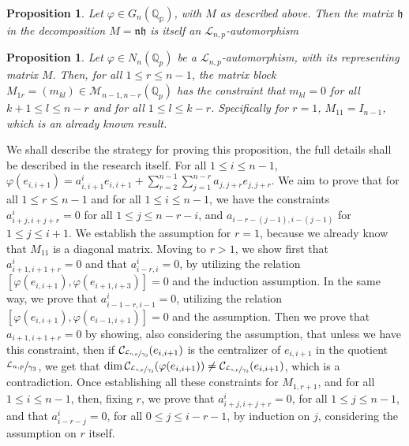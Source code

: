 \documentclass[12pt]{article}
\newtheorem{proposition}[theorem]{Proposition}
\begin{document}
\begin{proposition}
Let $\varphi\in{G_{n}(\mathbb{\mathbb{Q}_p})}$, with $M$ as described above. Then the matrix $\mathfrak{h}$ in the decomposition $M=\mathfrak{n}\mathfrak{h}$ is itself an $\mathcal{L}_{n,p}$-automorphism
\end{proposition}
\begin{proposition}
Let $\varphi\in{N_n(\mathbb{Q}_p)}$ be a $\mathcal{L}_{n,p}$-automorphism, with its representing matrix $M$. Then, for all $1\leq{r}\leq{n-1}$, the matrix block $M_{1r}=(m_{kl})\in\mathcal{M}_{n-1,n-r}(\mathbb{Q}_p)$ has the constraint that $m_{kl}=0$ for all ${k+1}\leq{l}\leq{n-r}$ and for all $1\leq{l}\leq{k-r}$. Specifically for $r=1$, $M_{11}=I_{n-1}$, which is an already known result.
\end{proposition}
We shall describe the strategy for proving this proposition, the full details shall be described in the research itself. For all $1\leq{i}\leq{n-1}$, $\varphi(e_{i,i+1})=a_{i,i+1}^{i}e_{i,i+1}+\sum_{r=2}^{n-1}\sum_{j=1}^{n-r}a_{j,j+r}e_{j,j+r}$. We aim to prove that for all $1\leq{r}\leq{n-1}$ and for all $1\leq{i}\leq{n-1}$, we have the constraints $a_{i+j,i+j+r}^{i}=0$ for all $1\leq{j}\leq{n-r-i}$, and $a_{i-r-(j-1),i-(j-1)}$ for $1\leq{j}\leq {i+1}$. We establish the assumption for $r=1$, because we already know that $M_{11}$ is a diagonal matrix. Moving to $r>1$, we show first that $a_{i+1,i+1+r}^{i}=0$ and that $a_{i-r,i}^{i}=0$, by utilizing the relation $[\varphi(e_{i,i+1}),\varphi(e_{i+1,i+3})]=0$ and the induction assumption.
In the same way, we prove that $a_{i-1-r,i-1}^{i}=0$, utilizing the relation $[\varphi(e_{i,i+1}),\varphi(e_{i-1,i+1})]=0$ and the assumption.
Then we prove that $a_{i+1,i+1+r}=0$ by showing, also considering the assumption, that unless we have this constraint, then if $\mathcal{C}_{\sfrac{\mathcal{L}_{n,p}}{\gamma_3}}(e_{i,i+1})$ is the centralizer of $e_{i,i+1}$ in the quotient $\sfrac{\mathcal{L}_{n,p}}{\gamma_3}$, we get that $\dim\mathcal{C}_{\sfrac{\mathcal{L}_{n,p}}{\gamma_3}}(\varphi(e_{i,i+1}))\neq\mathcal{C}_{\sfrac{\mathcal{L}_{n,p}}{\gamma_3}}(e_{i,i+1})$, which is a contradiction. Once establishing all these constraints for $M_{1,r+1}$, and for all $1\leq{i}\leq{n-1}$, then, fixing $r$, we prove that $a_{i+j,i+j+r}^{i}=0$, for all $1\leq{j}\leq{n-1}$, and that $a_{i-r-j}^{i}=0$, for all $0\leq{j}\leq{i-r-1}$, by induction on $j$, considering the assumption on $r$ itself.
\end{document}

